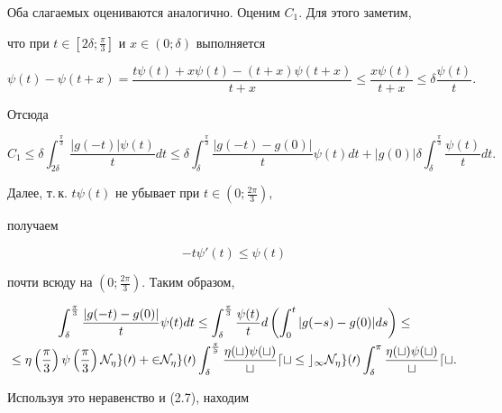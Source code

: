 Оба слагаемых оцениваются аналогично. Оценим $C_1$. Для этого заметим,


что при $t\in[2\delta;\frac{\pi}{3}]$ и $x\in(0;\delta)$ выполняется


\begin{equation}


\psi(t)-\psi(t+x)=\frac{t\psi(t)+x\psi(t)-(t+x)\psi(t+x)}{t+x}


\le\frac{x\psi(t)}{t+x}\le\delta\frac{\psi(t)}{t}.


\end{equation}


Отсюда


$$


C_1\le \delta\int_{2\delta}^{\frac{\pi}{3}}\frac{|g(-t)|\psi(t)}{t}dt\le


\delta\int_\delta^{\frac{\pi}{3}}\frac{|g(-t)-g(0)|}{t}\psi(t)dt+


|g(0)|\delta\int_\delta^{\frac{\pi}{3}}\frac{\psi(t)}{t}dt.


$$


Далее, т.\,к. $t\psi(t)$ не убывает при $t\in(0;\frac{2\pi}{3})$,


получаем


\begin{equation}


-t\psi'(t)\le\psi(t) 


\end{equation}


почти всюду на $(0;\frac{2\pi}{3})$. Таким образом,


\begin{multline*}


\int_\delta^{\frac{\pi}{3}}\frac{|g(-t)-g(0)|}{t}\psi(t)dt\le


\int_\delta^{\frac{\pi}{3}}\frac{\psi(t)}{t}d\left(


\int_0^t|g(-s)-g(0)|ds\right)\le \\


%


\le\eta\left(\frac{\pi}{3}\right)\psi\left(\frac{\pi}{3}\right)\N_\eta g(0)+


2\N_\eta g(0)\int_\delta^{\frac{\pi}{3}}\frac{\eta(t)\psi(t)}{t}dt\le


c_1\N_\eta g(0)\int_\delta^\pi\frac{\eta(t)\psi(t)}{t}dt.


\end{multline*}


Используя это неравенство и (2.7), находим


$$


